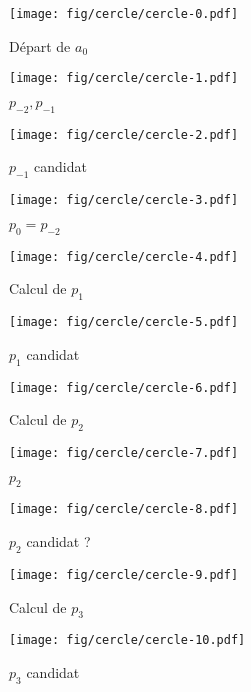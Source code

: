 \documentclass{beamer}
\begin{document}
\begin{frame}
\begin{columns}[t]
  \begin{column}{6cm}
{
  \begin{figure}[h!]
    \centering
    \texttt{[image: fig/cercle/cercle-0.pdf]}
    \caption{Départ de $a_{0}$}
\end{figure}
}
{
  \begin{figure}[h!]
    \centering
    \texttt{[image: fig/cercle/cercle-1.pdf]}
    \caption{$p_{-2}, p_{-1}$}
\end{figure}
}
{
  \begin{figure}[h!]
    \centering
    \texttt{[image: fig/cercle/cercle-2.pdf]}
    \caption{$p_{-1}$ candidat}
\end{figure}
}
{
  \begin{figure}[h!]
    \centering
    \texttt{[image: fig/cercle/cercle-3.pdf]}
    \caption{$p_{0} = p_{-2}$}
\end{figure}
}
{
  \begin{figure}[h!]
    \centering
    \texttt{[image: fig/cercle/cercle-4.pdf]}
    \caption{Calcul de $p_{1}$}
\end{figure}
}
{
  \begin{figure}[h!]
    \centering
    \texttt{[image: fig/cercle/cercle-5.pdf]}
    \caption{$p_{1}$ candidat}
\end{figure}
}
{
  \begin{figure}[h!]
    \centering
    \texttt{[image: fig/cercle/cercle-6.pdf]}
    \caption{Calcul de $p_{2}$}
\end{figure}
}
{
  \begin{figure}[h!]
    \centering
    \texttt{[image: fig/cercle/cercle-7.pdf]}
    \caption{$p_{2}$}
\end{figure}
}
{
  \begin{figure}[h!]
    \centering
    \texttt{[image: fig/cercle/cercle-8.pdf]}
    \caption{$p_{2}$ candidat ?}
\end{figure}
}
{
  \begin{figure}[h!]
    \centering
    \texttt{[image: fig/cercle/cercle-9.pdf]}
    \caption{Calcul de $p_{3}$}
\end{figure}
}
{
  \begin{figure}[h!]
    \centering
    \texttt{[image: fig/cercle/cercle-10.pdf]}
    \caption{$p_{3}$ candidat}
\end{figure}
}

\end{column}
\end{columns}
\end{frame}
\end{document}

